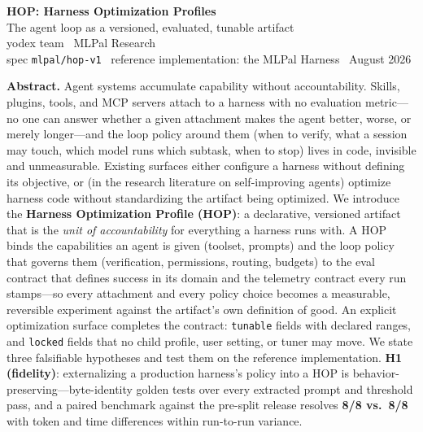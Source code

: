 \documentclass[10pt]{article}
\begin{document}
\begin{center}
{\LARGE\bfseries HOP: Harness Optimization Profiles}\\[0.35em]
{\large The agent loop as a versioned, evaluated, tunable artifact}\\[0.9em]
{\normalsize yodex team \textperiodcentered\ MLPal Research}\\[0.2em]
{\small spec \texttt{mlpal/hop-v1} \textperiodcentered\ reference implementation: the MLPal Harness \textperiodcentered\ August 2026}
\end{center}

\vspace{0.4em}
\begin{center}
\begin{minipage}{0.92\textwidth}
\small\color{ink}
\textbf{Abstract.} Agent systems accumulate capability without accountability. Skills, plugins,
tools, and MCP servers attach to a harness with no evaluation metric---no one can answer whether a
given attachment makes the agent better, worse, or merely longer---and the loop policy around them
(when to verify, what a session may touch, which model runs which subtask, when to stop) lives in
code, invisible and unmeasurable. Existing surfaces either configure a harness without defining its
objective, or (in the research literature on self-improving agents) optimize harness code without
standardizing the artifact being optimized. We introduce the \textbf{Harness Optimization Profile
(HOP)}: a declarative, versioned artifact that is the \emph{unit of accountability} for everything a
harness runs with. A HOP binds the capabilities an agent is given (toolset, prompts) and the loop
policy that governs them (verification, permissions, routing, budgets) to the eval contract that
defines success in its domain and the telemetry contract every run stamps---so every attachment and
every policy choice becomes a measurable, reversible experiment against the artifact's own definition
of good. An explicit optimization surface completes the contract: \texttt{tunable} fields with
declared ranges, and \texttt{locked} fields that no child profile, user setting, or tuner may move. We state three
falsifiable hypotheses and test them on the reference implementation. \textbf{H1 (fidelity)}:
externalizing a production harness's policy into a HOP is behavior-preserving---byte-identity golden
tests over every extracted prompt and threshold pass, and a paired benchmark against the pre-split
release resolves \textbf{8/8 vs.\ 8/8} with token and time differences within run-to-run variance.

\end{minipage}
\end{center}
\end{document}
